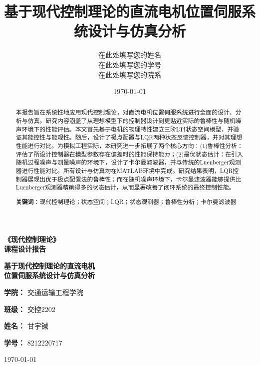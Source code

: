 \documentclass[12pt, a4paper]{article}
\title{\zihao{2}\bfseries 基于现代控制理论的直流电机位置伺服系统设计与仿真分析}
\author{\large 在此处填写您的姓名 \\ \large 在此处填写您的学号 \\ \large 在此处填写您的院系}
\date{\today}
\begin{document}
\begin{titlepage}
    \centering
    \vspace*{3cm} %
    
    \Huge \textbf{《现代控制理论》\\ [0.5em]课程设计报告}
    
    \vspace{2cm} %
    
    {\Huge \bfseries 基于现代控制理论的直流电机\\[0.5em]位置伺服系统设计与仿真分析\par}
    
    \vspace{3cm} %
    
    \Large \textbf{学院：} 交通运输工程学院
    
    \vspace{0.5cm}
    
    \Large \textbf{班级：} 交控2202
    
    \vspace{0.5cm}
    
    \Large \textbf{姓名：} 甘宇铖
    
    \vspace{0.5cm}
    
    \Large \textbf{学号：} 8212220717
    
    \vfill %
    
    {\large \today}
\end{titlepage}


\begin{abstract}
\noindent
本报告旨在系统性地应用现代控制理论，对直流电机位置伺服系统进行全面的设计、分析与仿真。研究内容涵盖了从理想模型下的控制器设计到更贴近实际的鲁棒性与随机噪声环境下的性能评估。本文首先基于电机的物理特性建立三阶LTI状态空间模型，并验证其能控性与能观性。随后，设计了极点配置与LQR两种状态反馈控制器，并对其理想性能进行对比。为模拟工程实际，本研究进一步拓展了两个核心方向：(1)鲁棒性分析：评估了所设计控制器在模型参数存在偏差时的性能保持能力；(2)最优状态估计：在引入随机过程噪声与测量噪声的环境下，设计了卡尔曼滤波器，并与传统的Luenberger观测器进行性能对比。所有设计与仿真均在MATLAB环境中完成。研究结果表明，LQR控制器展现出优于极点配置法的鲁棒性；而在随机噪声环境下，卡尔曼滤波器能够提供比Luenberger观测器精确得多的状态估计，从而显著改善了闭环系统的最终控制性能。
\vspace{1em} 

\noindent
\textbf{关键词}：现代控制理论；状态空间；LQR；状态观测器；鲁棒性分析；卡尔曼滤波器
\end{abstract}
\end{document}
